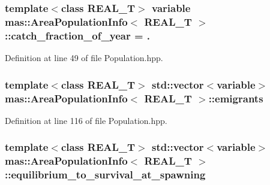 \hypertarget{structmas_1_1_area_population_info_a686e5f2a86446de54fa3aa3cd0aecba5}{
\subsubsection[{catch\-\_\-fraction\-\_\-of\-\_\-year}]{\setlength{\rightskip}{0pt plus 5cm}template$<$class R\-E\-A\-L\-\_\-\-T$>$ {\bf variable} {\bf mas\-::\-Area\-Population\-Info}$<$ R\-E\-A\-L\-\_\-\-T $>$\-::catch\-\_\-fraction\-\_\-of\-\_\-year = .}}\label{structmas_1_1_area_population_info_a686e5f2a86446de54fa3aa3cd0aecba5}


Definition at line 49 of file Population.\-hpp.

\hypertarget{structmas_1_1_area_population_info_aa1d1148625eac638e680972d69d8cc46}{
\subsubsection[{emigrants}]{\setlength{\rightskip}{0pt plus 5cm}template$<$class R\-E\-A\-L\-\_\-\-T$>$ std\-::vector$<${\bf variable}$>$ {\bf mas\-::\-Area\-Population\-Info}$<$ R\-E\-A\-L\-\_\-\-T $>$\-::emigrants}}\label{structmas_1_1_area_population_info_aa1d1148625eac638e680972d69d8cc46}


Definition at line 116 of file Population.\-hpp.

\hypertarget{structmas_1_1_area_population_info_a61c8acbefc2062274ecf9b4a5acca6d3}{
\subsubsection[{equilibrium\-\_\-to\-\_\-survival\-\_\-at\-\_\-spawning}]{\setlength{\rightskip}{0pt plus 5cm}template$<$class R\-E\-A\-L\-\_\-\-T$>$ std\-::vector$<${\bf variable}$>$ {\bf mas\-::\-Area\-Population\-Info}$<$ R\-E\-A\-L\-\_\-\-T $>$\-::equilibrium\-\_\-to\-\_\-survival\-\_\-at\-\_\-spawning}}\label{structmas_1_1_area_population_info_a61c8acbefc2062274ecf9b4a5acca6d3}


